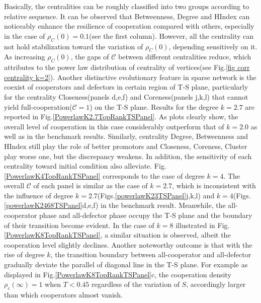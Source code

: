 \documentclass[preprint,12pt,3p]{elsarticle}
\begin{document}
Basically, the centralities can be roughly classified into two groups according to relative sequence.
It can be observed that Betweenness, Degree and HIndex can noticeably enhance the resilience of cooperation
compared with others, especially in the case of $\rho_{C}(0)=0.1$(see the first column).
However, all the centrality can not hold stabilization toward the variation of $\rho_{C}(0)$, depending sensitively on it.
As increasing $\rho_{C}(0)$, the gaps of $\mathcal{C}$ between different centralities reduce,
which attributes to the power law distribution of centrality of vertices(see Fig.\ref{fig corr centrality k=2}).
Another distinctive evolutionary feature in sparse network is the coexist of cooperators and defectors in certain
region of T-S plane, particularly for the centrality Closeness(panels d,e,f) and Coreness(panels j,k,l)
that cannot yield full-cooperation($\mathcal{C}=1$) on the T-S plane.
    Results for the degree $k=2.7$ are reported in Fig.\ref{PowerlawK2.7TopRankTSPanel}.
As plots clearly show, the overall level of cooperation in this case considerably outperform that of $k=2.0$
as well as in the benchmark results.
Similarly, centrality Degree, Betweenness and HIndex still play the role of better promotors and Closeness, Coreness, Cluster play worse one, but the discrepancy weakens.
In addition, the sensitivity of each centrality toward initial condition also alleviate.
    Fig.\ref{PowerlawK4TopRankTSPanel} corresponds to the case of degree $k=4$.
The overall $\mathcal{C}$ of each panel is similar as the case of $k=2.7$,
which is inconsistent with the influence of degree $k=2.7$(Figs.\ref{powerlawK23TSPanel}j,k,l)
and $k=4$(Figs.\ref{powerlawK2468TSPanel}d,e,f) in the benchmark result.
Meanwhile, the all-cooperator phase and all-defector phase occupy the T-S plane and the
boundary of their transition become evident.
In the case of $k=8$ illustrated in Fig.\ref{PowerlawK8TopRankTSPanel},
a similar situation is observed, albeit the cooperation level slightly declines.
    Another noteworthy outcome is that with the rise of degree $k$, the transition boundary between
all-cooperator and all-defector gradually deviate the parallel of diagonal line in the T-S plane.
For example as displayed in Fig.\ref{PowerlawK8TopRankTSPanel}c, the cooperation density
$\rho_{c}(\infty)=1$ when $T<0.45$ regardless of the variation of $S$, accordingly larger than which cooperators almost vanish.
\end{document}
